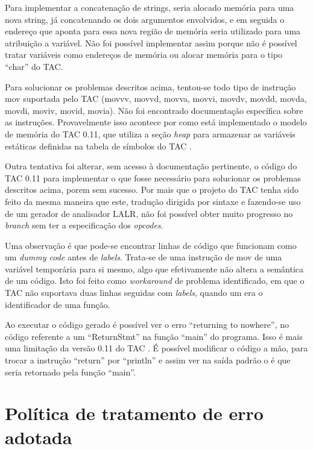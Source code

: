 \documentclass[12pt]{article}
\begin{document}
Para implementar a concatenação de strings, seria alocado memória para uma nova string, já concatenando os dois argumentos envolvidos, e em seguida o endereço que aponta para essa nova região de memória seria utilizado para uma atribuição a variável. Não foi possível implementar assim porque não é possível tratar variáveis como endereços de memória ou alocar memória para o tipo ``char'' do TAC.

Para solucionar os problemas descritos acima, tentou-se todo tipo de instrução mov suportada pelo TAC (movvv, movvd, movva, movvi, movdv, movdd, movda, movdi, moviv, movid, movia). Não foi encontrado documentação específica sobre as instruções. Provavelmente isso acontece por como está implementado o modelo de memória do TAC 0.11, que utiliza a seção \textit{heap} para armazenar as variáveis estáticas definidas na tabela de símbolos do TAC \cite{tac2014}.

Outra tentativa foi alterar, sem acesso à documentação pertinente, o código do TAC 0.11 para implementar o que fosse necessário para solucionar os problemas descritos acima, porem sem sucesso. Por mais que o projeto do TAC tenha sido feito da mesma maneira que este, tradução dirigida por sintaxe e fazendo-se uso de um gerador de analisador LALR, não foi possível obter muito progresso no \textit{branch} sem ter a especificação dos \textit{opcodes}.

Uma observação é que pode-se encontrar linhas de código que funcionam como um \textit{dummy code} antes de \textit{labels}. Trata-se de uma instrução de mov de uma variável temporária para si mesmo, algo que efetivamente não altera a semântica de um código. Isto foi feito como \textit{workaround} de problema identificado, em que o TAC não suportava duas linhas seguidas com \textit{labels}, quando um era o identificador de uma função.

Ao executar o código gerado é possível ver o erro ``returning to nowhere'', no código referente a um ``ReturnStmt'' na função ``main'' do programa. Isso é mais uma limitação da versão 0.11 do TAC \cite{tac2014}. É possível modificar o código a mão, para trocar a instrução ``return'' por ``println'' e assim ver na saída padrão o é que seria retornado pela função ``main''.

\section{Política de tratamento de erro adotada}

\indent
\end{document}
